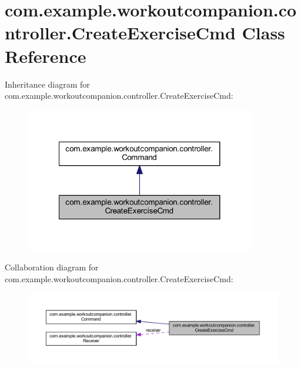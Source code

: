\hypertarget{classcom_1_1example_1_1workoutcompanion_1_1controller_1_1_create_exercise_cmd}{\section{com.\-example.\-workoutcompanion.\-controller.\-Create\-Exercise\-Cmd Class Reference}
\label{classcom_1_1example_1_1workoutcompanion_1_1controller_1_1_create_exercise_cmd}
}


Inheritance diagram for com.\-example.\-workoutcompanion.\-controller.\-Create\-Exercise\-Cmd\-:
\nopagebreak
\begin{figure}[H]
\begin{center}
\leavevmode
\includegraphics[width=284pt]{classcom_1_1example_1_1workoutcompanion_1_1controller_1_1_create_exercise_cmd__inherit__graph}
\end{center}
\end{figure}


Collaboration diagram for com.\-example.\-workoutcompanion.\-controller.\-Create\-Exercise\-Cmd\-:
\nopagebreak
\begin{figure}[H]
\begin{center}
\leavevmode
\includegraphics[width=350pt]{classcom_1_1example_1_1workoutcompanion_1_1controller_1_1_create_exercise_cmd__coll__graph}
\end{center}
\end{figure}
